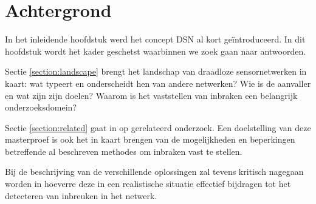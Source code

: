 
\chapter{Achtergrond}
\label{chapter:achtergrond}

In het inleidende hoofdstuk werd het concept DSN al kort ge\"introduceerd. In
dit hoofdstuk wordt het kader geschetst waarbinnen we zoek gaan naar
antwoorden.

Sectie \ref{section:landscape} brengt het landschap van draadloze
sensornetwerken in kaart: wat typeert en onderscheidt hen van andere netwerken?
Wie is de aanvaller en wat zijn zijn doelen? Waarom is het vaststellen van
inbraken een belangrijk onderzoeksdomein?

Sectie \ref{section:related} gaat in op gerelateerd onderzoek. Een doelstelling
van deze masterproef is ook het in kaart brengen van de mogelijkheden en
beperkingen betreffende al beschreven methodes om inbraken vast te stellen.

Bij de beschrijving van de verschillende oplossingen zal tevens kritisch
nagegaan worden in hoeverre deze in een realistische situatie effectief
bijdragen tot het detecteren van inbreuken in het netwerk.



